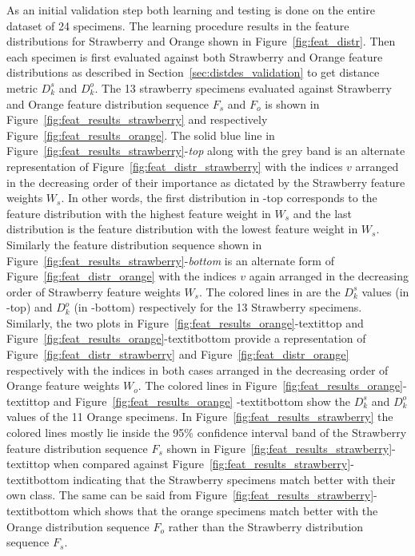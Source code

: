 \documentclass {udthesis}
\begin{document}
As an initial validation step both learning and testing is done on the entire dataset of 24 specimens. The learning procedure
results in the feature distributions for Strawberry and Orange shown in Figure~\ref{fig:feat_distr}. Then each specimen is first evaluated against both Strawberry and Orange feature distributions as described in Section~\ref{sec:distdes_validation} to get distance metric $D^s_k$ and $D^o_k$. The 13 strawberry specimens evaluated against Strawberry and Orange feature distribution sequence $F_{s}$ and $F_{o}$ is shown in Figure~\ref{fig:feat_results_strawberry} and respectively Figure~\ref{fig:feat_results_orange}. The solid blue line in Figure~\ref{fig:feat_results_strawberry}-\textit{top} along with the grey band is an alternate representation of Figure~\ref{fig:feat_distr_strawberry} with the indices $v$ arranged in the decreasing order of their importance as dictated by the Strawberry feature weights $W_s$. In other words, the first distribution in -top corresponds to the feature distribution with the highest feature weight in $W_{s}$ and the last distribution is the 
feature distribution with the lowest feature weight in $W_{s}$. Similarly the feature distribution sequence shown in Figure~\ref{fig:feat_results_strawberry}-\textit{bottom} is an alternate form of  Figure~\ref{fig:feat_distr_orange} with the indices $v$ again arranged in the decreasing order of Strawberry feature weights $W_s$. The colored lines in  are the $D^s_k$ values (in -top) and $D^o_k$ (in -bottom) respectively for the 13 Strawberry specimens. Similarly, the two plots in Figure~\ref{fig:feat_results_orange}-textit{top} and Figure~\ref{fig:feat_results_orange}-textit{bottom} provide a representation of Figure~\ref{fig:feat_distr_strawberry} and Figure~\ref{fig:feat_distr_orange} respectively with the indices in both cases arranged in the decreasing order of Orange feature weights $W_o$. The colored lines in Figure~\ref{fig:feat_results_orange}-textit{top} and Figure~\ref{fig:feat_results_orange}
-textit{bottom} show the $D^s_k$ and $D^o_k$ values of the 11 Orange specimens. In Figure~\ref{fig:feat_results_strawberry} the colored lines mostly lie inside the 95\% confidence interval band of the Strawberry feature distribution sequence $F_s$ shown in Figure~\ref{fig:feat_results_strawberry}-textit{top} when compared against Figure~\ref{fig:feat_results_strawberry}-textit{bottom} indicating that the Strawberry specimens match better with their own class. The same can be said from Figure~\ref{fig:feat_results_strawberry}-textit{bottom} which shows that the orange specimens match better with the Orange distribution sequence $F_o$ rather than the Strawberry distribution sequence $F_s$.
\end{document}
